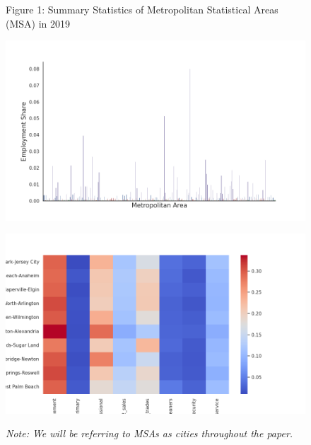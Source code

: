 \documentclass[10pt]{article}
\begin{document}

\begin{figure}[!htb]
    \centering
    Figure 1: Summary Statistics of Metropolitan Statistical Areas (MSA) in 2019\par\medskip
    \begin{minipage}{0.48\textwidth}
        \centering
        \includegraphics[width=\textwidth]{../../estimations/graphs/city_employment_share.png}
        \label{employment_city_share}
    \end{minipage}\hfill
    \begin{minipage}{0.48\textwidth}
        \centering
        \includegraphics[width=\textwidth]{../../estimations/graphs/top_25_city_heatmap.png}
        \label{top_25_city_heatmap}
    \end{minipage}
    \caption*{\small\textit{Note: We will be referring to MSAs as cities throughout the paper.}}
\end{figure}
\end{document}

